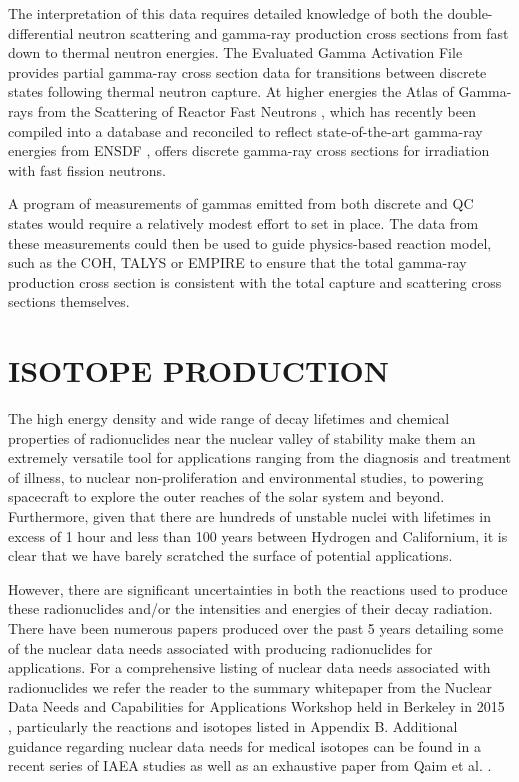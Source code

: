 \documentclass[letterpaper]{ar-1col}
\begin{document}
The interpretation of this data requires detailed knowledge of both the double-differential neutron scattering and gamma-ray production cross sections from fast down to thermal neutron energies.
 The Evaluated Gamma Activation File \cite{Fir15} provides partial gamma-ray cross section data for transitions between discrete states following thermal neutron capture.
 At higher energies the Atlas of Gamma-rays from the Scattering of Reactor Fast Neutrons \cite{Dem78}, which has recently been compiled into a database and reconciled to reflect state-of-the-art gamma-ray energies from ENSDF \cite{Hur18}, offers discrete gamma-ray cross sections for irradiation with fast fission neutrons.
 

A program of measurements of gammas emitted from both discrete and QC states would require a relatively modest effort to set in place.
 The data from these measurements could then be used to guide physics-based reaction model, such as the COH, TALYS or EMPIRE to ensure that the total gamma-ray production cross section is consistent with the total capture and scattering cross sections themselves.



\section{ISOTOPE PRODUCTION}\label{sec:isotope_production}


The high energy density and wide range of decay lifetimes and chemical properties of radionuclides near the nuclear valley of stability make them an extremely versatile tool for applications ranging from the diagnosis and treatment of illness, to nuclear non-proliferation and environmental studies, to powering spacecraft to explore the outer reaches of the solar system and beyond.
Furthermore, given that there are hundreds of unstable nuclei with lifetimes in excess of 1 hour and less than 100 years between Hydrogen and Californium, it is clear that we have barely scratched the surface of potential applications.

However, there are significant uncertainties in both the reactions used to produce these radionuclides and/or the intensities and energies of their decay radiation.
 There have been numerous papers produced over the past 5 years detailing some of the nuclear data needs associated with producing radionuclides for applications.
For a comprehensive listing of nuclear data needs associated with radionuclides we refer the reader to the summary whitepaper from the Nuclear Data Needs and Capabilities for Applications Workshop held in Berkeley in 2015 \cite{bernstein2015nuclear}, particularly the reactions and isotopes listed in Appendix B.
 Additional guidance regarding nuclear data needs for medical isotopes can be found in a recent series of IAEA studies \cite{Iae675,Iae596,Iae591} as well as an exhaustive paper from Qaim et al. \cite{Qaim201731}.
\end{document}
